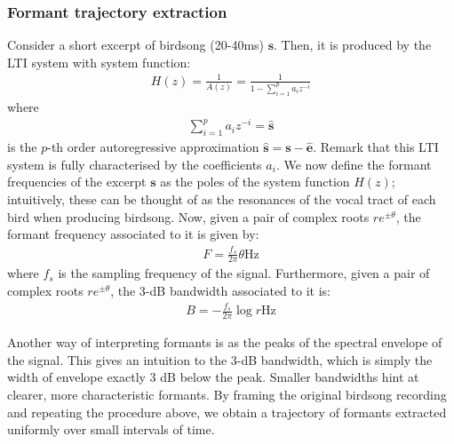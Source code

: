 \documentclass[pdftex,11pt,a4paper]{article}
\theoremstyle{definition}
\theoremstyle{remark}
\newcommand*{\V}[1]{\mathbf{#1}}%
\begin{document}
\subsubsection{Formant trajectory extraction}
\par Consider a short excerpt of birdsong (20-40ms) $\V{s}$. Then, it is produced by the LTI system with system function:
\begin{align*}
H(z) = \frac{1}{A(z)} = \frac{1}{1-\sum_{i=1}^pa_iz^{-i}}
\end{align*}
where 
\begin{align*}
\sum_{i=1}^pa_iz^{-i} = \V{\hat{s}}
\end{align*}
is the $p$-th order autoregressive approximation $\V{\hat{s}} = \V{s} - \V{\hat{e}}$. Remark that this LTI system is fully characterised by the coefficients $a_i$. We now define the formant frequencies of the excerpt $\V{s}$ as the poles of the system function $H(z)$; intuitively, these can be thought of as the resonances of the vocal tract of each bird when producing birdsong. Now, given a pair of complex roots $re^{\pm\theta}$, the formant frequency associated to it is given by:
\begin{align*}
F = \frac{f_s}{2\pi}\theta \text{Hz}
\end{align*}
where $f_s$ is the sampling frequency of the signal. Furthermore, given a pair of complex roots $re^{\pm\theta}$, the 3-dB bandwidth associated to it is:
\begin{align*}
B = -\frac{f_s}{2\pi}\log{r} \text{Hz}
\end{align*}
\par Another way of interpreting formants is as the peaks of the spectral envelope of the signal. This gives an intuition to the 3-dB bandwidth, which is simply the width of envelope exactly 3 dB below the peak. Smaller bandwidths hint at clearer, more characteristic formants. By framing the original birdsong recording and repeating the procedure above, we obtain a trajectory of formants extracted uniformly over small intervals of time. 
\end{document}
